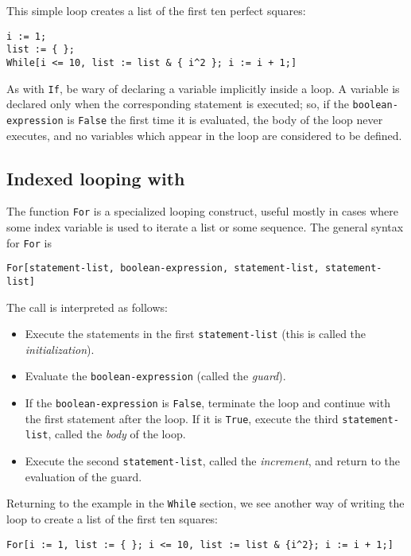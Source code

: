 This simple loop creates a list of the first ten perfect squares: 

\begin{verbatim}
i := 1;
list := { };
While[i <= 10, list := list & { i^2 }; i := i + 1;]
\end{verbatim}

As with \verb+If+, be wary of declaring a variable implicitly inside a
loop.  A variable is declared only when the corresponding statement is
executed; so, if the \verb+boolean-expression+ is \verb+False+ the
first time it is evaluated, the body of the loop never executes, and
no variables which appear in the loop are considered to be defined.

\subsection{Indexed looping with }

The function \verb+For+ is a specialized looping construct, useful
mostly in cases where some index variable is used to iterate a list or
some sequence.  The general syntax for \verb+For+ is

\begin{verbatim}
For[statement-list, boolean-expression, statement-list, statement-list]
\end{verbatim}

\noindent The call is interpreted as follows:
\begin{itemize}
\item Execute the statements in the first \verb+statement-list+ (this
is called the {\em initialization}).
\item Evaluate the \verb+boolean-expression+ (called the {\em guard}).
\item If the \verb+boolean-expression+ is \verb+False+, terminate the
loop and continue with the first statement after the loop.  If it is
\verb+True+, execute the third \verb+statement-list+, called the {\em
body} of the loop.
\item Execute the second \verb+statement-list+, called the {\em
increment}, and return to the evaluation of the guard.
\end{itemize}

Returning to the example in the \verb+While+ section, we see another
way of writing the loop to create a list of the first ten squares:

\begin{verbatim}
For[i := 1, list := { }; i <= 10, list := list & {i^2}; i := i + 1;]
\end{verbatim}

